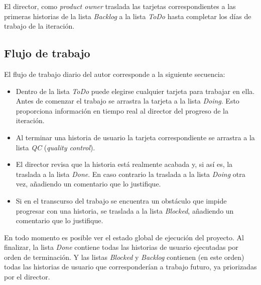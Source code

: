 El director, como \emph{product owner} traslada las tarjetas correspondientes a las primeras historias de la lista \emph{Backlog} a la lista \emph{ToDo} hasta completar los días de trabajo de la iteración.

\subsection{Flujo de trabajo}
El flujo de trabajo diario del autor corresponde a la siguiente secuencia:
\begin{itemize}
    \item Dentro de la lista \emph{ToDo} puede elegirse cualquier tarjeta para trabajar en ella. Antes de comenzar el trabajo se arrastra la tarjeta a la lista \emph{Doing}. Esto proporciona información en tiempo real al director del progreso de la iteración.
    
    \item Al terminar una historia de usuario la tarjeta correspondiente se arrastra a la lista \emph{QC} (\emph{quality control}).
    
    \item El director revisa que la historia está realmente acabada y, si así es, la traslada a la lista \emph{Done}. En caso contrario la traslada a la lista \emph{Doing} otra vez, añadiendo un comentario que lo justifique.

    \item Si en el transcurso del trabajo se encuentra un obstáculo que impide progresar con una historia, se traslada a la lista \emph{Blocked}, añadiendo un comentario que lo justifique.
\end{itemize}

En todo momento es posible ver el estado global de ejecución del proyecto. Al finalizar, la lista \emph{Done} contiene todas las historias de usuario ejecutadas por orden de terminación. Y las listas \emph{Blocked} y \emph{Backlog} contienen (en este orden) todas las historias de usuario que corresponderían a trabajo futuro, ya priorizadas por el director.

